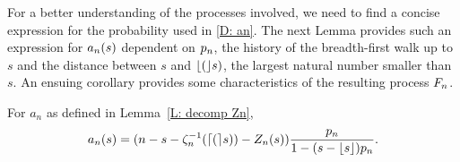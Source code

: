 For a better understanding of the processes involved, we need to find a concise expression for the probability used in \eqref{D: an}.
The next Lemma provides such an expression for $a_n(s)$ 
dependent on $p_n$, the history of the breadth-first walk up to $s$ and the distance between $s$ and $\lfloor(\rfloor s)$, 
the largest natural number smaller than $s$.
An ensuing corollary provides some characteristics of the resulting process $F_n$.

\begin{lemma} \label{L: formula an}
	For $a_n$ as defined in Lemma~\ref{L: decomp Zn},
	\begin{equation}
	a_n(s) = (n - s - \zeta^{-1}_n(\lceil(\rceil s)) - Z_n(s)) \frac{p_n}{1-(s-\lfloor s\rfloor)p_n} .
	\end{equation}
\end{lemma}

